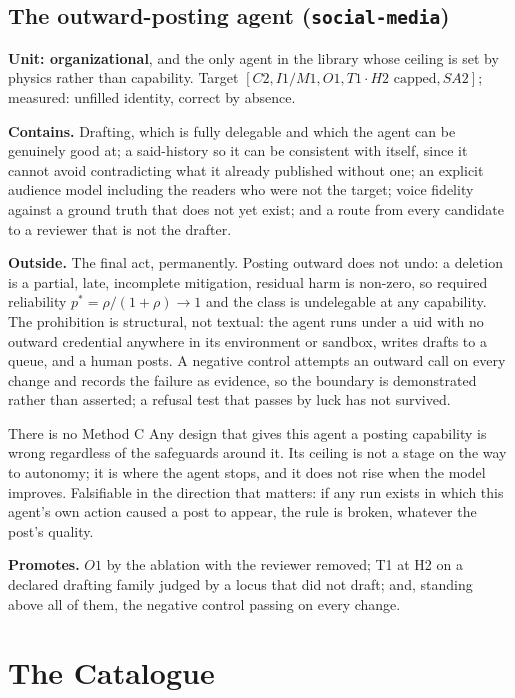 \subsection{The outward-posting agent (\texttt{social-media})}\label{sec:social}

\textbf{Unit: organizational}, and the only agent in the library whose ceiling is set by physics rather than capability. Target $[C2, I1/M1, O1, T1\cdot H2 \text{ capped}, SA2]$; measured: unfilled identity, correct by absence.

\textbf{Contains.} Drafting, which is fully delegable and which the agent can be genuinely good at; a said-history so it can be consistent with itself, since it cannot avoid contradicting what it already published without one; an explicit audience model including the readers who were not the target; voice fidelity against a ground truth that does not yet exist; and a route from every candidate to a reviewer that is not the drafter.

\textbf{Outside.} The final act, permanently. Posting outward does not undo: a deletion is a partial, late, incomplete mitigation, residual harm is non-zero, so required reliability $p^{*} = \rho/(1+\rho) \to 1$ and the class is undelegable at any capability. The prohibition is structural, not textual: the agent runs under a uid with no outward credential anywhere in its environment or sandbox, writes drafts to a queue, and a human posts. A negative control attempts an outward call on every change and records the failure as evidence, so the boundary is demonstrated rather than asserted; a refusal test that passes by luck has not survived.

\begin{cautionbox}{There is no Method C}
Any design that gives this agent a posting capability is wrong regardless of the safeguards around it. Its ceiling is not a stage on the way to autonomy; it is where the agent stops, and it does not rise when the model improves. Falsifiable in the direction that matters: if any run exists in which this agent's own action caused a post to appear, the rule is broken, whatever the post's quality.
\end{cautionbox}

\textbf{Promotes.} $O1$ by the ablation with the reviewer removed; T1 at H2 on a declared drafting family judged by a locus that did not draft; and, standing above all of them, the negative control passing on every change.

\section{The Catalogue}\label{sec:catalogue}

